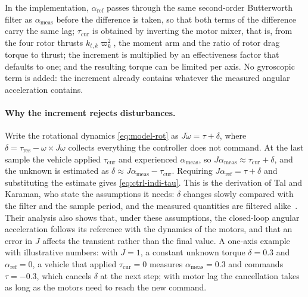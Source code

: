 In the implementation, $\alpha_{\mathrm{ref}}$ passes through the same second-order Butterworth
filter as $\alpha_{\mathrm{meas}}$ before the difference is taken, so that both terms of the
difference carry the same lag; $\tau_{\mathrm{cur}}$ is obtained by inverting the motor mixer, that
is, from the four rotor thrusts $k_{t,k}\varpi_k^2$, the moment arm and the ratio of rotor drag
torque to thrust; the increment is multiplied by an effectiveness factor that defaults to one;
and the resulting torque can be limited per axis. No gyroscopic term is added: the increment
already contains whatever the measured angular acceleration contains.

\paragraph{Why the increment rejects disturbances.} Write the rotational dynamics
\eqref{eq:model-rot} as $J\dot\omega = \tau + \delta$, where
$\delta = \tau_{\mathrm{res}} - \omega\times J\omega$ collects everything the controller does not
command. At the last sample the vehicle applied $\tau_{\mathrm{cur}}$ and experienced
$\alpha_{\mathrm{meas}}$, so $J\alpha_{\mathrm{meas}} \approx \tau_{\mathrm{cur}} + \delta$, and the
unknown is estimated as $\delta \approx J\alpha_{\mathrm{meas}} - \tau_{\mathrm{cur}}$. Requiring
$J\alpha_{\mathrm{ref}} = \tau + \delta$ and substituting the estimate gives
\eqref{eq:ctrl-indi-tau}. This is the derivation of Tal and Karaman, who state the assumptions it
needs: $\delta$ changes slowly compared with the filter and the sample period, and the measured
quantities are filtered alike~\cite{tal2018indi}. Their analysis also shows that, under these
assumptions, the closed-loop angular acceleration follows its reference with the dynamics of the
motors, and that an error in $J$ affects the transient rather than the final value. A one-axis
example with illustrative numbers: with $J = 1$, a constant unknown torque $\delta = 0.3$ and
$\alpha_{\mathrm{ref}} = 0$, a vehicle that applied $\tau_{\mathrm{cur}} = 0$ measures
$\alpha_{\mathrm{meas}} = 0.3$ and commands $\tau = -0.3$, which cancels $\delta$ at the next step;
with motor lag the cancellation takes as long as the motors need to reach the new command.

